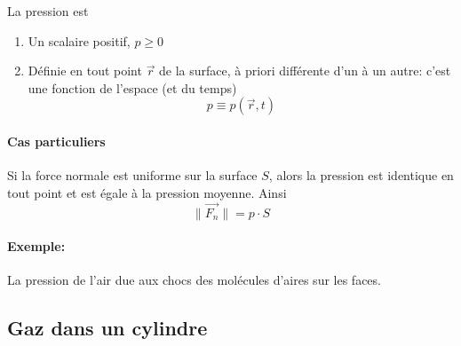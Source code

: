 \documentclass[
    11pt,
    a4paper,
    oneside,
    headinlcude, footinclude,
    twoside,
]{report}
\renewcommand{\vec}[1]{\overrightarrow{#1}}
\begin{document}
La pression est

\begin{enumerate}
    \item Un scalaire positif, $p \geq 0$
    \item Définie en tout point $\vec r$ de la surface, à priori différente d'un
        à un autre: c'est une fonction de l'espace (et du temps)
        $$p \equiv p (\vec r, t)$$
\end{enumerate}


\paragraph{Cas particuliers}

Si la force normale est uniforme sur la surface $S$, alors la pression est
identique en tout point et est égale à la pression moyenne. Ainsi
\begin{equation}
    \| \vec{F_{n}} \| = p \cdot S 
\end{equation}

\paragraph{Exemple:}

La pression de l'air due aux chocs des molécules d'aires sur les faces.

\subsection{Gaz dans un cylindre}
\label{sub:gaz_dans_un_cylindre}
\end{document}
